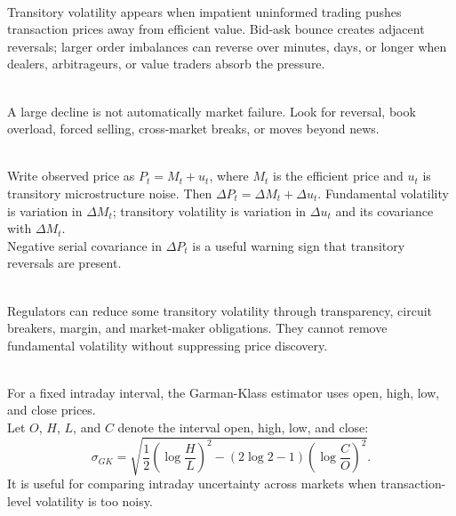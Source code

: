 \documentclass[a4paper,oneside,openany]{book}
\begin{document}
\begin{mechanism} \\
Transitory volatility appears when impatient uninformed trading pushes transaction prices away from efficient value. Bid-ask bounce creates adjacent reversals; larger order imbalances can reverse over minutes, days, or longer when dealers, arbitrageurs, or value traders absorb the pressure.
\end{mechanism}

\begin{caveat} \\
A large decline is not automatically market failure. Look for reversal, book overload, forced selling, cross-market breaks, or moves beyond news.
\end{caveat}

\begin{model} \\
Write observed price as $P_t=M_t+u_t$, where $M_t$ is the efficient price and $u_t$ is transitory microstructure noise. Then $\Delta P_t=\Delta M_t+\Delta u_t$. Fundamental volatility is variation in $\Delta M_t$; transitory volatility is variation in $\Delta u_t$ and its covariance with $\Delta M_t$.\\
Negative serial covariance in $\Delta P_t$ is a useful warning sign that transitory reversals are present.
\end{model}

\begin{caveat} \\
Regulators can reduce some transitory volatility through transparency, circuit breakers, margin, and market-maker obligations. They cannot remove fundamental volatility without suppressing price discovery.
\end{caveat}

\begin{definition} \\
For a fixed intraday interval, the Garman-Klass estimator uses open, high, low, and close prices.\\
Let $O$, $H$, $L$, and $C$ denote the interval open, high, low, and close:
\begin{equation*}
\sigma_{GK}= \sqrt{\frac{1}{2}\left(\log\frac{H}{L}\right)^2-\left(2\log 2-1\right)\left(\log\frac{C}{O}\right)^2}.
\end{equation*}
It is useful for comparing intraday uncertainty across markets when transaction-level volatility is too noisy.
\end{definition}
\end{document}
